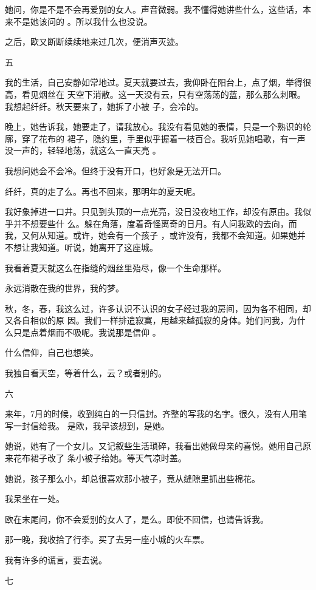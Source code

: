 \documentclass[12pt,a4paper]{article}
\newcommand{\subpart}[1]{
	\begingroup \par
	\vspace{1ex} \centering #1
	\par \endgroup \nopagebreak[4]
}
\begin{document}
		她问，你是不是不会再爱别的女人。声音微弱。我不懂得她讲些什么，这些话，本来不是她该问的
	。所以我什么也没说。

		之后，欧又断断续续地来过几次，便消声灭迹。

		\subpart{五}

		我的生活，自己安静如常地过。夏天就要过去，我仰卧在阳台上，点了烟，举得很高，看见烟丝在
	天空下消散。这一天没有云，只有空荡荡的蓝，那么那么刺眼。我想起纤纤。秋天要来了，她拆了小被
	子，会冷的。

		晚上，她告诉我，她要走了，请我放心。我没有看见她的表情，只是一个熟识的轮廓，穿了花布的
	裙子，隐约里，手里似乎握着一枝百合。我听见她唱歌，有一声没一声的，轻轻地荡，就这么一直天亮
	。

		我想问她会不会冷。但终于没有开口，也好象是无法开口。\par
		纤纤，真的走了么。再也不回来，那明年的夏天呢。

		我好象掉进一口井。只见到头顶的一点光亮，没日没夜地工作，却没有原由。我似乎并不想要些什
	么。躲在角落，度着奇怪离奇的日月。有人问我欧的去向，而我，又何从知道。或许，她会有一个孩子
	，或许没有，我都不会知道。如果她并不想让我知道。听说，她离开了这座城。

		我看着夏天就这么在指缝的烟丝里殆尽，像一个生命那样。\par
		永远消散在我的世界，我的梦。

		秋，冬，春，我这么过，许多认识不认识的女子经过我的房间，因为各不相同，却又各自相似的原
	因。我们一样排遣寂寞，用越来越孤寂的身体。她们问我，为什么只是点着烟而不吸呢。我说那是信仰
	。

		什么信仰，自己也想笑。\par
		我独自看天空，等着什么，云？或者别的。

		\subpart{六}

		来年，7月的时候，收到纯白的一只信封。齐整的写我的名字。很久，没有人用笔写一封信给我。
	是欧，我早该想到，是她。

		她说，她有了一个女儿。又记叙些生活琐碎，我看出她做母亲的喜悦。她用自己原来花布裙子改了
	条小被子给她。等天气凉时盖。

		她说，孩子那么小，却总很喜欢那小被子，竟从缝隙里抓出些棉花。\par
		我呆坐在一处。\par
		欧在末尾问，你不会爱别的女人了，是么。即使不回信，也请告诉我。\par
		那一晚，我收拾了行李。买了去另一座小城的火车票。\par
		我有许多的谎言，要去说。

		\subpart{七}
\end{document}
